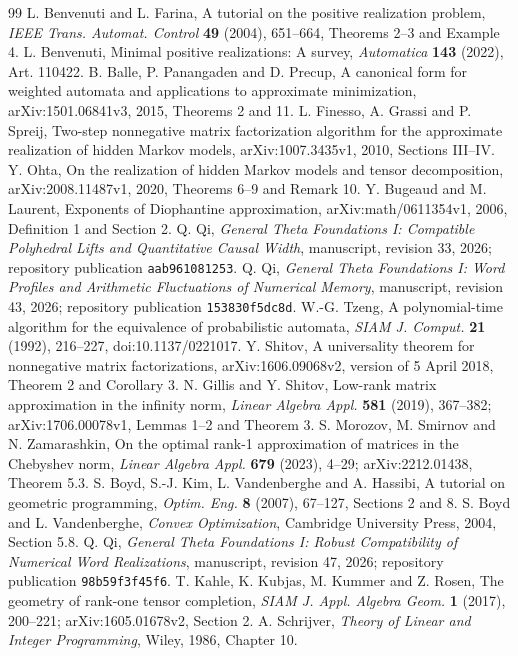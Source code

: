 \begin{thebibliography}{99}
 L. Benvenuti and L. Farina,
A tutorial on the positive realization problem,
\emph{IEEE Trans. Automat. Control} \textbf{49} (2004), 651--664,
Theorems 2--3 and Example 4.
 L. Benvenuti,
Minimal positive realizations: A survey,
\emph{Automatica} \textbf{143} (2022), Art. 110422.
 B. Balle, P. Panangaden and D. Precup,
A canonical form for weighted automata and applications to approximate minimization,
arXiv:1501.06841v3, 2015, Theorems 2 and 11.
 L. Finesso, A. Grassi and P. Spreij,
Two-step nonnegative matrix factorization algorithm for the approximate realization of hidden Markov models,
arXiv:1007.3435v1, 2010, Sections III--IV.
 Y. Ohta,
On the realization of hidden Markov models and tensor decomposition,
arXiv:2008.11487v1, 2020, Theorems 6--9 and Remark 10.
 Y. Bugeaud and M. Laurent,
Exponents of Diophantine approximation,
arXiv:math/0611354v1, 2006, Definition 1 and Section 2.
 Q. Qi,
\emph{General Theta Foundations I: Compatible Polyhedral Lifts and Quantitative Causal Width},
manuscript, revision 33, 2026; repository publication \texttt{aab961081253}.
 Q. Qi,
\emph{General Theta Foundations I: Word Profiles and Arithmetic Fluctuations of Numerical Memory},
manuscript, revision 43, 2026; repository publication \texttt{153830f5dc8d}.
 W.-G. Tzeng,
A polynomial-time algorithm for the equivalence of probabilistic automata,
\emph{SIAM J. Comput.} \textbf{21} (1992), 216--227,
doi:10.1137/0221017.
 Y. Shitov,
A universality theorem for nonnegative matrix factorizations,
arXiv:1606.09068v2, version of 5 April 2018, Theorem 2 and Corollary 3.
 N. Gillis and Y. Shitov,
Low-rank matrix approximation in the infinity norm,
\emph{Linear Algebra Appl.} \textbf{581} (2019), 367--382;
arXiv:1706.00078v1, Lemmas 1--2 and Theorem 3.
 S. Morozov, M. Smirnov and N. Zamarashkin,
On the optimal rank-1 approximation of matrices in the Chebyshev norm,
\emph{Linear Algebra Appl.} \textbf{679} (2023), 4--29;
arXiv:2212.01438, Theorem 5.3.
 S. Boyd, S.-J. Kim, L. Vandenberghe and A. Hassibi,
A tutorial on geometric programming,
\emph{Optim. Eng.} \textbf{8} (2007), 67--127, Sections 2 and 8.
 S. Boyd and L. Vandenberghe,
\emph{Convex Optimization}, Cambridge University Press, 2004, Section 5.8.
 Q. Qi,
\emph{General Theta Foundations I: Robust Compatibility of Numerical Word Realizations},
manuscript, revision 47, 2026; repository publication \texttt{98b59f3f45f6}.
 T. Kahle, K. Kubjas, M. Kummer and Z. Rosen,
The geometry of rank-one tensor completion,
\emph{SIAM J. Appl. Algebra Geom.} \textbf{1} (2017), 200--221;
arXiv:1605.01678v2, Section 2.
 A. Schrijver,
\emph{Theory of Linear and Integer Programming}, Wiley, 1986, Chapter 10.
\end{thebibliography}
